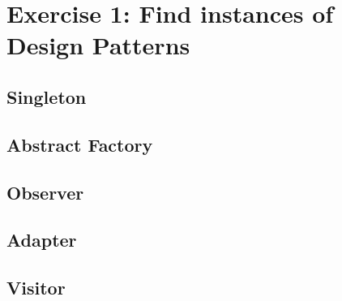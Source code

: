 \section{Exercise 1: Find instances of Design Patterns}

\subsection{Singleton}

\subsection{Abstract Factory}

\subsection{Observer}

\subsection{Adapter}

\subsection{Visitor}

\newpage
